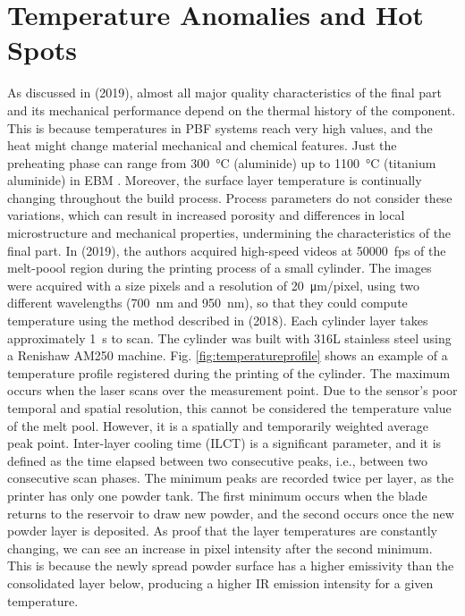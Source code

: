 
\section{Temperature Anomalies and Hot Spots}
\label{sec:hotspot}
As discussed in \citeauthor{williams_situ_2019} (2019), almost all major quality characteristics of the final part and its mechanical performance depend on the thermal history of the component. This is because temperatures in PBF systems reach very high values, and the heat might change material mechanical and chemical features. Just the preheating phase can range from \SI{300}{\degreeCelsius} (aluminide) up to \SI{1100}{\degreeCelsius} (titanium aluminide) in EBM \cite{milewski_additive_2017}. Moreover, the surface layer temperature is continually changing throughout the build process. Process parameters do not consider these variations, which can result in increased porosity and differences in local microstructure and mechanical properties, undermining the characteristics of the final part. In \citeauthor{williams_situ_2019} (2019), the authors acquired high-speed videos at \SI{50000}{fps} of the melt-poool region during the printing process of a small cylinder. The images were acquired with a size \unit{pixels} and a resolution of \SI{20}{\micro\metre / pixel}, using two different wavelengths (\SI{700}{\nano\metre} and \SI{950}{\nano\metre}), so that they could compute temperature using the method described in \citeauthor{hooper_melt_2018} (2018). Each cylinder layer takes approximately \SI{1}{\second} to scan. The cylinder was built with 316L stainless steel using a Renishaw AM250 machine. Fig. \ref{fig:temperatureprofile} shows an example of a temperature profile registered during the printing of the cylinder. The maximum occurs when the laser scans over the measurement point. Due to the sensor's poor temporal and spatial resolution, this cannot be considered the temperature value of the melt pool. However, it is a spatially and temporarily weighted average peak point. Inter-layer cooling time (ILCT) is a significant parameter, and it is defined as the time elapsed between two consecutive peaks, i.e., between two consecutive scan phases. The minimum peaks are recorded twice per layer, as the printer has only one powder tank. The first minimum occurs when the blade returns to the reservoir to draw new powder, and the second occurs once the new powder layer is deposited. As proof that the layer temperatures are constantly changing, we can see an increase in pixel intensity after the second minimum. This is because the newly spread powder surface has a higher emissivity than the consolidated layer below, producing a higher IR emission intensity for a given temperature.
